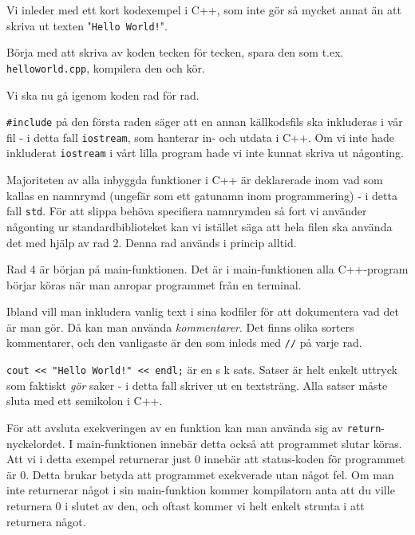Vi inleder med ett kort kodexempel i C++, som inte gör så mycket annat än att skriva ut texten "\texttt{Hello World!}".



Börja med att skriva av koden tecken för tecken, spara den som t.ex. \texttt{helloworld.cpp}, kompilera den och kör.

Vi ska nu gå igenom koden rad för rad.

\texttt{\#include} på den första raden säger att en annan källkodsfils ska inkluderas i vår fil - i detta fall \texttt{iostream}, som hanterar in- och utdata i C++. Om vi inte hade inkluderat \texttt{iostream} i vårt lilla program hade vi inte kunnat skriva ut någonting. 

Majoriteten av alla inbyggda funktioner i C++ är deklarerade inom vad som kallas en namnrymd (ungefär som ett gatunamn inom programmering) - i detta fall \texttt{std}. För att slippa behöva specifiera namnrymden så fort vi använder någonting ur standardbiblioteket kan vi istället säga att hela filen ska använda det med hjälp av rad 2. Denna rad används i princip alltid.

Rad 4 är början på main-funktionen. Det är i main-funktionen alla C++-program börjar köras när man anropar programmet från en terminal.

Ibland vill man inkludera vanlig text i sina kodfiler för att dokumentera vad det är man gör. Då kan man använda \emph{kommentarer}. Det finns olika sorters kommentarer, och den vanligaste är den som inleds med \texttt{//} på varje rad.

\texttt{cout << "Hello World!" << endl;} är en s k sats. Satser är helt enkelt uttryck som faktiskt \emph{gör} saker - i detta fall skriver ut en textsträng. Alla satser måste sluta med ett semikolon i C++.

För att avsluta exekveringen av en funktion kan man använda sig av \texttt{return}-nyckelordet. I main-funktionen innebär detta också att programmet slutar köras. Att vi i detta exempel returnerar just 0 innebär att status-koden för programmet är 0. Detta brukar betyda att programmet exekverade utan något fel. Om man inte returnerar något i sin main-funktion kommer kompilatorn anta att du ville returnera 0 i slutet av den, och oftast kommer vi helt enkelt strunta i att returnera något.
